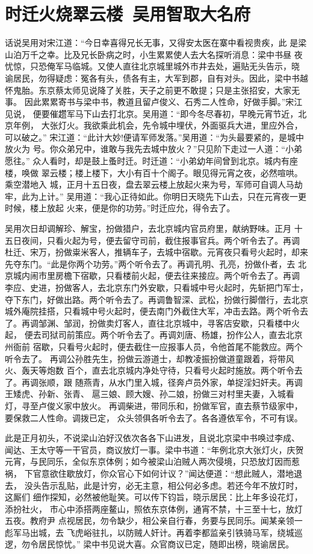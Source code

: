 \chapter{时迁火烧翠云楼~吴用智取大名府}

话说吴用对宋江道：“今日幸喜得兄长无事，又得安太医在寨中看视贵疾，此
是梁山泊万千之幸。比及兄长卧病之时，小生累累使人去大名探听消息：梁中书昼
夜忧惊，只恐俺军马临城。又使人直往北京城里城外市井去处，遍贴无头告示，晓
谕居民，勿得疑虑：冤各有头，债各有主，大军到郡，自有对头。因此，梁中书越
怀鬼胎。东京蔡太师见说降了关胜，天子之前更不敢提；只是主张招安，大家无事。
因此累累寄书与梁中书，教道且留卢俊义、石秀二人性命，好做手脚。”宋江见说，
便要催趱军马下山去打北京。吴用道：“即今冬尽春初，早晚元宵节近，北京年例，
大张灯火。我欲乘此机会，先令城中埋伏，外面驱兵大进，里应外合，可以破之。”
宋江道：“此计大妙!便请军师发落。”吴用道：“为头最要紧的，是城中放火为
号。你众弟兄中，谁敢与我先去城中放火？”只见阶下走过一人道：“小弟愿往。”
众人看时，却是鼓上蚤时迁。时迁道：“小弟幼年间曾到北京。城内有座楼，唤做
翠云楼；楼上楼下，大小有百十个阁子。眼见得元宵之夜，必然喧哄。乘空潜地入
城，正月十五日夜，盘去翠云楼上放起火来为号，军师可自调人马劫牢，此为上计。”
吴用道：“我心正待如此。你明日天晓先下山去，只在元宵夜一更时候，楼上放起
火来，便是你的功劳。”时迁应允，得令去了。

吴用次日却调解珍、解宝，扮做猎户，去北京城内官员府里，献纳野味。正月
十五日夜间，只看火起为号，便去留守司前，截住报事官兵。两个听令去了。再调
杜迁、宋万，扮做粜米客人，推辆车子，去城中宿歇。元宵夜只看号火起时，却来
先夺东门。“此是你两个功劳。”两个听令去了。再调孔明、孔亮，扮做仆者，去
北京城内闹市里房檐下宿歇，只看楼前火起，便去往来接应。两个听令去了。再调
李应、史进，扮做客人，去北京东门外安歇，只看城中号火起时，先斩把门军士，
夺下东门，好做出路。两个听令去了。再调鲁智深、武松，扮做行脚僧行，去北京
城外庵院挂搭，只看城中号火起时，便去南门外截住大军，冲击去路。两个听令去
了。再调邹渊、邹润，扮做卖灯客人，直往北京城中，寻客店安歇，只看楼中火起，
便去司狱司前策应。两个听令去了。再调刘唐、杨雄，扮作公人，直去北京州衙前
宿歇，只看号火起时，便去截住一应报事人员，令他首尾不能救应。两个听令去了。
再调公孙胜先生，扮做云游道士，却教凌振扮做道童跟着，将带风火、轰天等炮数
百个，直去北京城内净处守待，只看号火起时施放。两个听令去了。再调张顺，跟
随燕青，从水门里入城，径奔卢员外家，单捉淫妇奸夫。再调王矮虎、孙新、张青、
扈三娘、顾大嫂、孙二娘，扮做三对村里夫妻，入城看灯，寻至卢俊义家中放火。
再调柴进，带同乐和，扮做军官，直去蔡节级家中，要保救二人性命。调拨已定，
众头领俱各听令去了。各各遵依军令，不可有误。

此是正月初头，不说梁山泊好汉依次各各下山进发，且说北京梁中书唤过李成、
闻达、王太守等一干官员，商议放灯一事。梁中书道：“年例北京大张灯火，庆贺
元宵，与民同乐，全似东京体例；如今被梁山泊贼人两次侵境，只恐放灯因而惹祸，
下官意欲住歇放灯，你众官心下如何计议？”闻达便道：“想此贼人，潜地退去，
没头告示乱贴，此是计穷，必无主意，相公何必多虑。若还今年不放灯时，这厮们
细作探知，必然被他耻笑。可以传下钧旨，晓示居民：比上年多设花灯，添扮社火，
市心中添搭两座鳌山，照依东京体例，通宵不禁，十三至十七，放灯五夜。教府尹
点视居民，勿令缺少，相公亲自行春，务要与民同乐。闻某亲领一彪军马出城，去
飞虎峪驻扎，以防贼人奸计。再着李都监亲引铁骑马军，绕城巡逻，勿令居民惊忧。”
梁中书见说大喜。众官商议已定，随即出榜，晓谕居民。

